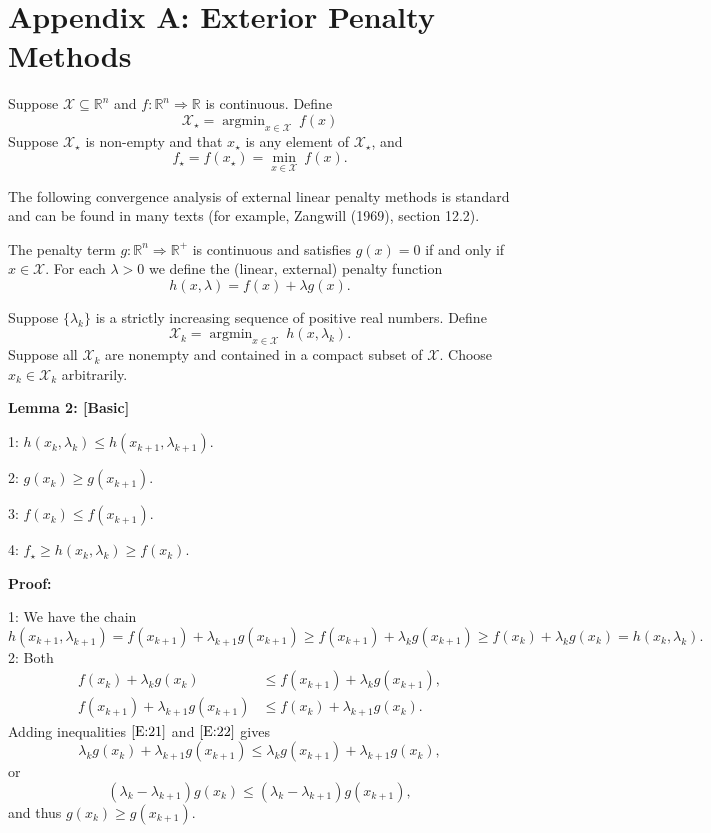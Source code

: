 \documentclass[
  12pt,
]{article}
\begin{document}
\section{Appendix A: Exterior Penalty
Methods}\label{appendix-a-exterior-penalty-methods}

Suppose \(\mathcal{X}\subseteq\mathbb{R}^n\) and
\(f:\mathbb{R}^n\Rightarrow\mathbb{R}\) is continuous. Define \[
\mathcal{X}_\star=\mathop{\text{argmin}}_{x\in\mathcal{X}}\ f(x)
\] Suppose \(\mathcal{X}_\star\) is non-empty and that \(x_\star\) is
any element of \(\mathcal{X}_\star\), and \[
f_\star=f(x_\star)=\min_{x\in\mathcal{X}}\ f(x).
\]

The following convergence analysis of external linear penalty methods is
standard and can be found in many texts (for example, Zangwill (1969),
section 12.2).

The penalty term \(g:\mathbb{R}^n\Rightarrow\mathbb{R}^+\) is continuous
and satisfies \(g(x)=0\) if and only if \(x\in\mathcal{X}\). For each
\(\lambda>0\) we define the (linear, external) penalty function
\begin{equation}
h(x,\lambda)=f(x)+\lambda g(x).
\end{equation}

Suppose \(\{\lambda_k\}\) is a strictly increasing sequence of positive
real numbers. Define \begin{equation}
\mathcal{X}_k=\mathop{\text{argmin}}_{x\in\mathcal{X}}\ h(x,\lambda_k).
\end{equation} Suppose all \(\mathcal{X}_k\) are nonempty and contained
in a compact subset of \(\mathcal{X}\). Choose \(x_k\in\mathcal{X}_k\)
arbitrarily.

\textbf{Lemma 2: {[}Basic{]}}

1: \(h(x_k,\lambda_k)\leq h(x_{k+1},\lambda_{k+1})\).

2: \(g(x_k)\geq g(x_{k+1})\).

3: \(f(x_k)\leq f(x_{k+1})\).

4: \(f_\star\geq h(x_k,\lambda_k)\geq f(x_k)\).

\textbf{Proof:}

1: We have the chain \[
h(x_{k+1},\lambda_{k+1})=f(x_{k+1})+\lambda_{k+1} g(x_{k+1})\geq f(x_{k+1})+\lambda_{k} g(x_{k+1})\geq f(x_{k})+\lambda_{k}g(x_k)=h(x_k,\lambda_k).
\] 2: Both \begin{align}
f(x_k)+\lambda_k g(x_k)&\leq f(x_{k+1})+\lambda_k g(x_{k+1}),\label{E:21}\\
f(x_{k+1})+\lambda_{k+1} g(x_{k+1})&\leq f(x_k)+\lambda_{k+1} g(x_k).\label{E:22}
\end{align} Adding inequalities \(\eqref{E:21}\) and \(\eqref{E:22}\)
gives \[
\lambda_k g(x_k)+\lambda_{k+1} g(x_{k+1})\leq\lambda_k g(x_{k+1})+\lambda_{k+1} g(x_k),
\] or \[
(\lambda_k-\lambda_{k+1})g(x_k)\leq(\lambda_k-\lambda_{k+1})g(x_{k+1}),
\] and thus \(g(x_k)\geq g(x_{k+1})\).
\end{document}
